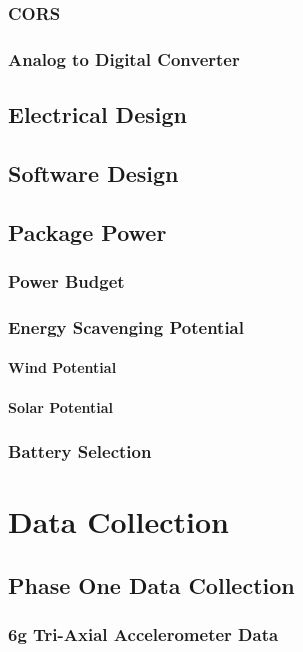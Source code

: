 \documentclass[12pt]{report}
\begin{document}
		\subsection{CORS}
		\subsection{Analog to Digital Converter}
			
	\section{Electrical Design}
			
	\section{Software Design}
		
	\section{Package Power}
		\subsection{Power Budget}
		\subsection{Energy Scavenging Potential}
			\subsubsection{Wind Potential}
			\subsubsection{Solar Potential}
		\subsection{Battery Selection}
		
\chapter{Data Collection}
\label{ch:DataCollection}
	\section{Phase One Data Collection}
		\subsection{6g Tri-Axial Accelerometer Data}
			
\end{document}
